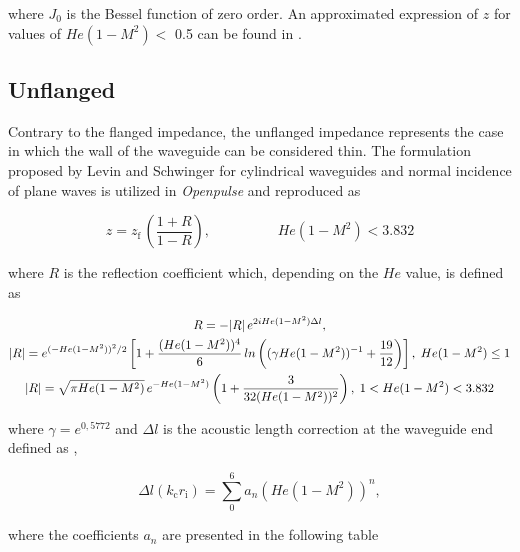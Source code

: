 \documentclass[12pt]{article}
\begin{document}
\noindent where $J_0$ is the Bessel function of zero order. An approximated expression of $z$ for values of $He(1 - M^2) <$ 0.5 can be found in \cite{unflanged-dalmont, finnjacobsen_2013_fundamentals}. 

\subsection{Unflanged}

Contrary to the flanged impedance, the unflanged impedance represents the case in which the wall of the waveguide can be considered thin. The formulation proposed by Levin and Schwinger \cite{levin-unflanged} for cylindrical waveguides and normal incidence of plane waves is utilized in \textit{Openpulse} and reproduced as

\begin{equation}
	z = z_\text{f}  \,\left( \frac{1 + R}{ 1 - R} \right), \hspace{2cm} He(1 - M^2)  < 3.832
\end{equation}

\noindent where $R$ is the reflection coefficient which, depending on the $He$ value, is defined as

\begin{gather}
	\footnotesize
	R  = - |R| \, e^{2 i He(1 - M^2)  \Delta l},  \\
	|R|  = e^{(- He(1 - M^2)  )^2 / 2} \left[ 1 + \frac{( He(1 - M^2)  )^4}{6} \, ln\left((\gamma He(1 - M^2) )^{-1} + \frac{19}{12}\right)  \right], \; He(1 - M^2)  \leq 1 \\
    |R| = \sqrt{\pi He(1 - M^2)  } \,  e^{- He(1 - M^2)  } \left( 1 + \frac{3}{32 ( He(1 - M^2)  )^2} \right), \; 1 < He(1 - M^2) < 3.832
\end{gather}

\noindent where $\gamma = e^{0,5772}$ and $\Delta l$ is the acoustic length correction at the waveguide end defined as \cite{levin-unflanged},

\begin{equation}
	\Delta l (k_{\text{c}} r_{\text{i}}) = \sum_0^6 a_n (He(1 - M^2) )^n,
\end{equation}

\noindent where the coefficients $a_n$ are presented in the following table
\end{document}
